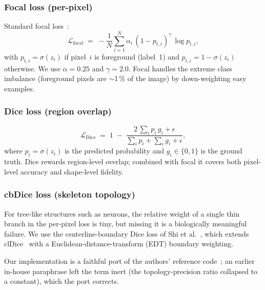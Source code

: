 \documentclass[11pt,a4paper]{article}
\begin{document}
\subsubsection{Focal loss (per-pixel)}

Standard focal loss~\cite{focal}:
\begin{equation}
    \mathcal{L}_\text{focal} \;=\;
        -\frac{1}{N}\sum_{i=1}^{N}
        \alpha_i \,(1 - p_{t,i})^\gamma \,\log p_{t,i},
\end{equation}
with $p_{t,i} = \sigma(z_i)$ if pixel~$i$ is foreground (label~1) and
$p_{t,i} = 1 - \sigma(z_i)$ otherwise. We use $\alpha = 0.25$ and
$\gamma = 2.0$. Focal handles the extreme class imbalance (foreground
pixels are $\sim$1\,\% of the image) by down-weighting easy examples.

\subsubsection{Dice loss (region overlap)}

\begin{equation}
    \mathcal{L}_\text{Dice} \;=\;
        1 \;-\; \frac{2\,\sum_i p_i\, g_i + \epsilon}
                       {\sum_i p_i + \sum_i g_i + \epsilon},
\end{equation}
where $p_i = \sigma(z_i)$ is the predicted probability and $g_i \in \{0,1\}$
is the ground truth. Dice rewards region-level overlap; combined with
focal it covers both pixel-level accuracy and shape-level fidelity.

\subsubsection{cbDice loss (skeleton topology)}
\label{sec:cbdice}

For tree-like structures such as neurons, the relative weight of a
single thin branch in the per-pixel loss is tiny, but missing it is a
biologically meaningful failure. We use the centerline-boundary Dice
loss of Shi et al.~\cite{cbdice}, which extends clDice~\cite{cldice}
with a Euclidean-distance-transform (EDT) boundary weighting.

Our implementation is a faithful port of the authors' reference
code~\cite{cbdice}; an earlier in-house paraphrase left the term inert
(the topology-precision ratio collapsed to a constant), which the port
corrects.
\end{document}
